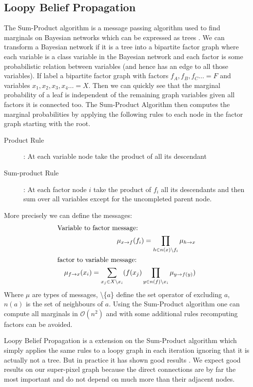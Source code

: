 \subsection{Loopy Belief Propagation}\label{sec:loopybp}
The Sum-Product algorithm is a message passing algorithm used to find marginals on Bayesian networks which can be expressed as trees \cite{sumProductAlgo}. We can transform a Bayesian network if it is a tree into a bipartite factor graph where each variable is a class variable in the Bayesian network and each factor is some probabilistic relation between variables (and hence has an edge to all those variables). If label a bipartite factor graph with factors $f_A, f_B, f_C ... = F$ and variables $x_1, x_2, x_3, x_4 ... = X $. Then we can quickly see that the marginal probability of a leaf is independent of the remaining graph variables given all factors it is connected too. The Sum-Product Algorithm then computes the marginal probabilities by applying the following rules to each node in the factor graph starting with the root. 
\begin{description}
\item[Product Rule]: At each variable node take the product of all its descendant
\item[Sum-product Rule] : At each factor node $i$ take the product of $f_i$ all its descendants and then sum over all variables except for the uncompleted parent node.
\end{description}
More precisely we can define the messages: 
\begin{align}
\shortintertext{Variable to factor message: } 
\mu_{x \rightarrow f}(f_i) = \prod_{h \in n(x)  \backslash f_i } \mu_{h \rightarrow x} \\
\shortintertext{factor to variable message: } 
\quad \mu_{f \rightarrow x}(x_i) = \sum_{x_j \in X \backslash x_i } ( f(x_j) \prod_{ y \in n(f) \backslash x_i } \mu_{y \rightarrow f(y)})
\end{align}
Where $\mu$ are types of messages, \textbackslash\{$a$\} define the set operator of excluding $a$, $n(a)$ is the set of neighbours of $a$. 
Using the Sum-Product algorithm one can compute all marginals in $\mathcal{O}(n^2)$ and with some additional rules recomputing factors can be avoided. 
\par
Loopy Belief Propagation is a extension on the Sum-Product algorithm which simply applies the same rules to a loopy graph in each iteration ignoring that it is actually not a tree. But in practice it has shown good results \cite{murphy1999loopy}. We expect good results on our super-pixel graph because the direct connections are by far the most important and do not depend on much more than their adjacent nodes. 
%
%
%
%
%
%
%
%
%
%
%
%
%
